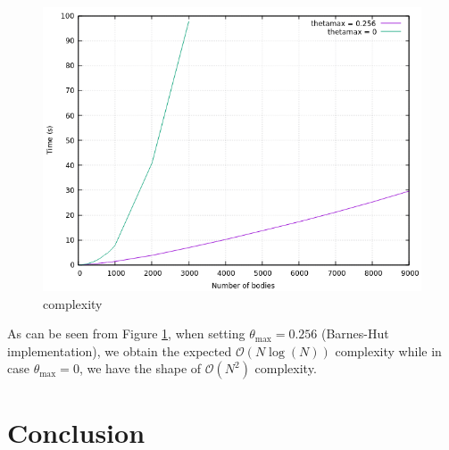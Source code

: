 \documentclass[12pt,oneside,a4paper]{article}
\begin{document}
\begin{figure}[h]
	\centering
	\includegraphics[scale=0.9]{complexity.png}
	\caption{complexity}
	\label{fig:complexity}
\end{figure}

As can be seen from Figure \ref{fig:complexity}, when setting $\theta_{\max} = 0.256$ (Barnes-Hut implementation), we obtain the expected $\mathcal{O} (N\log(N))$ complexity while in case $\theta_{\max} = 0$, we have the shape of $\mathcal{O} (N^2)$ complexity.



\section{Conclusion}
\label{sec:conclusion}
\end{document}
